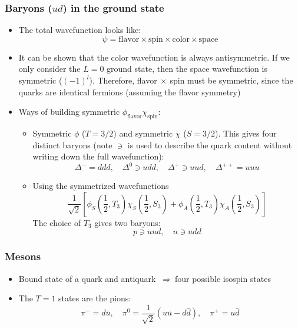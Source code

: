 \documentclass[11pt]{article}
\newcommand{\ubar}{\bar{u}}
\newcommand{\dbar}{\bar{d}}
\newcommand{\thus}{\ensuremath{~\Rightarrow~}}
\begin{document}
\subsubsection{Baryons ($ud$) in the ground state}
\begin{itemize}
  \item The total wavefunction looks like:
  \begin{equation}
    \psi = \text{flavor}\times\text{spin}\times\text{color}\times\text{space}
  \end{equation}
  \item It can be shown that the color wavefunction is always antisymmetric. If we only consider the $L=0$ ground state, then the space wavefunction is symmetric ($(-1)^l$). Therefore, flavor$~\times~$spin must be symmetric, since the quarks are identical fermions (assuming the flavor symmetry)
  \item Ways of building symmetric $\phi_\text{flavor}\chi_\text{spin}$:
  \begin{itemize}
    \item Symmetric $\phi$ ($T=3/2$) and symmetric $\chi$ ($S=3/2$). This gives four distinct baryons (note $\ni$ is used to describe the quark content without writing down the full wavefunction):
    \begin{equation}
      \Delta^- = ddd,\quad
      \Delta^0 \ni udd,\quad
      \Delta^+ \ni uud,\quad
      \Delta^{++} = uuu
    \end{equation}
    \item Using the symmetrized wavefunctions 
    \begin{equation}
    \dfrac{1}{\sqrt2}\left[\phi_S\left(\frac{1}{2},T_3\right)\chi_S\left(\frac{1}{2},S_3\right)+\phi_A\left(\frac{1}{2},T_3\right)\chi_A\left(\frac{1}{2},S_3\right)\right]
    \end{equation}
    The choice of $T_3$ gives two baryons:
    \begin{equation}
      p \ni uud, \quad n \ni udd
    \end{equation}
  \end{itemize}
\end{itemize}

\subsubsection{Mesons}
\begin{itemize}
  \item Bound state of a quark and antiquark \thus four possible isospin states
  \item The $T=1$ states are the pions:
  \begin{equation}
    \pi^- = d\ubar,\quad \pi^0 = \frac{1}{\sqrt2} (u\ubar-d\dbar),\quad \pi^+ = u\dbar
  \end{equation}
\end{itemize}
\end{document}

